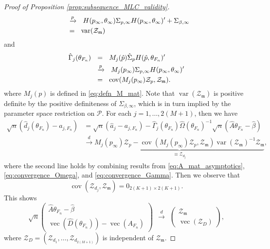 \documentclass[11pt]{article}
\theoremstyle{definition}
\DeclareMathOperator{\cov}{cov}
\DeclareMathOperator{\var}{var}
\newcommand{\0}{\ensuremath{\mathbf{0}}}
\begin{document}
\begin{bibunit}
\begin{proof}[Proof of Proposition \ref{prop:subsequence_MLC_validity}]
\begin{align}
	&~~\xrightarrow{p}~~
	H(p_{\infty}, \theta_{\infty}) {\Sigma}_{p,\infty} H(p_{\infty}, \theta_{\infty})' + {\Sigma}_{\beta,\infty} \notag \\
	&~~=~~ \var(\mathcal{Z}_{\mathfrak{m}}) \label{eq:convergence_Omega} 
	\end{align}
and
\begin{align}
	\hat{\Gamma}_j(\theta_{F_n})
	&~~=~~ M_j(\hat{p})\hat{\Sigma}_p H(\hat{p}, \theta_{F_n})' \notag \\
	&~~\xrightarrow{p}~~
	M_j(p_{\infty}){\Sigma}_{p,\infty} H(p_{\infty}, \theta_{\infty})' \notag \\
	&~~=~~ \cov(M_j(p_\infty)\mathcal{Z}_p, \mathcal{Z}_{\mathfrak{m}}). \label{eq:convergence_Gamma}
\end{align}
where $M_j(p)$ is defined in \eqref{eq:defn_M_mat}. 
Note that $\var(\mathcal{Z}_{\mathfrak{m}})$ is positive definite by the positive definiteness of $\Sigma_{\beta,\infty}$, which is in turn implied by the parameter space restriction on $\mathcal{P}$. For each $j = 1,\ldots,2(M+1)$, then we have
\begin{align*}
	\sqrt{n}(\hat{d}_j(\theta_{F_n}) - a_{j,F_n}) 
	&= \sqrt{n}(\hat{a}_j - a_{j,F_n}) - \hat{\Gamma}_j(\theta_{F_n})\hat{\Omega}(\theta_{F_n})^{-1}\sqrt{n}(\hat{A}\theta_{F_n} - \hat{\beta}) \\
	&\xrightarrow{d} \underbrace{M_j(p_{\infty}) \mathcal{Z}_p - \cov(M_j(p_\infty)\mathcal{Z}_p, \mathcal{Z}_{\mathfrak{m}})\var(\mathcal{Z}_{\mathfrak{m}})^{-1}\mathcal{Z}_{\mathfrak{m}}}_{\equiv \mathcal{Z}_{d_j}},
\end{align*}
where the second line holds by combining results from \eqref{eq:A_mat_asymptotics}, \eqref{eq:convergence_Omega}, and \eqref{eq:convergence_Gamma}. Then we observe that
\[
	\cov(\mathcal{Z}_{d_j}, \mathcal{Z}_{\mathfrak{m}})
	= 0_{2(K+1)\times 2(K+1)}.
\]
This shows
\begin{equation}
\label{eq:convergence_moment}
	\sqrt{n}
	\begin{pmatrix}
		\hat{A}\theta_{F_n} - \hat{\beta} \\
		\operatorname*{vec}(\hat{D}(\theta_{F_n})) - \operatorname*{vec}(A_{F_n})
	\end{pmatrix}
	~~\xrightarrow{d}~~
	\begin{pmatrix}
		\mathcal{Z}_{\mathfrak{m}} \\
		\operatorname*{vec}(\mathcal{Z}_D)
  \end{pmatrix},
\end{equation}
where $\mathcal{Z}_D = (\mathcal{Z}_{d_1}, \ldots, \mathcal{Z}_{d_{2(M+1)}})$ is independent of $\mathcal{Z}_{\mathfrak{m}}$. 


\end{proof}
\end{bibunit}
\end{document}
